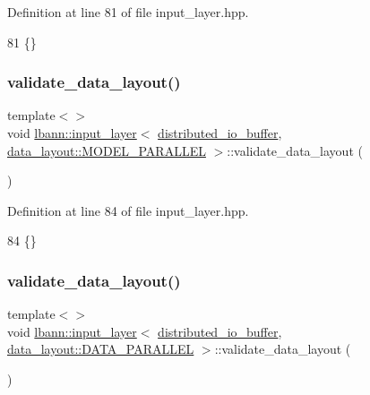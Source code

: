 Definition at line 81 of file input\+\_\+layer.\+hpp.


\begin{DoxyCode}
81 \{\}
\end{DoxyCode}
\mbox{\label{classlbann_1_1input__layer_a4335c1d23efe251f7d7164d907a11d65}} 
\subsubsection{\texorpdfstring{validate\+\_\+data\+\_\+layout()}{validate\_data\_layout()}\hspace{0.1cm}{\footnotesize\ttfamily [4/5]}}
{\footnotesize\ttfamily template$<$$>$ \\
void \hyperlink{classlbann_1_1input__layer}{lbann\+::input\+\_\+layer}$<$ \hyperlink{classlbann_1_1distributed__io__buffer}{distributed\+\_\+io\+\_\+buffer}, \hyperlink{base_8hpp_a786677cbfb3f5677b4d84f3056eb08dbac94d7b0e44ab8bdcdad694a673cdeae0}{data\+\_\+layout\+::\+M\+O\+D\+E\+L\+\_\+\+P\+A\+R\+A\+L\+L\+EL} $>$\+::validate\+\_\+data\+\_\+layout (\begin{DoxyParamCaption}{ }\end{DoxyParamCaption})\hspace{0.3cm}{\ttfamily [inline]}}



Definition at line 84 of file input\+\_\+layer.\+hpp.


\begin{DoxyCode}
84 \{\}
\end{DoxyCode}
\mbox{\label{classlbann_1_1input__layer_a26ae8f3e7a583bda6ead168b2be77fa1}} 
\subsubsection{\texorpdfstring{validate\+\_\+data\+\_\+layout()}{validate\_data\_layout()}\hspace{0.1cm}{\footnotesize\ttfamily [5/5]}}
{\footnotesize\ttfamily template$<$$>$ \\
void \hyperlink{classlbann_1_1input__layer}{lbann\+::input\+\_\+layer}$<$ \hyperlink{classlbann_1_1distributed__io__buffer}{distributed\+\_\+io\+\_\+buffer}, \hyperlink{base_8hpp_a786677cbfb3f5677b4d84f3056eb08dba37d2a3465f7cbf4ab60f4e79944d0638}{data\+\_\+layout\+::\+D\+A\+T\+A\+\_\+\+P\+A\+R\+A\+L\+L\+EL} $>$\+::validate\+\_\+data\+\_\+layout (\begin{DoxyParamCaption}{ }\end{DoxyParamCaption})\hspace{0.3cm}{\ttfamily [inline]}}



